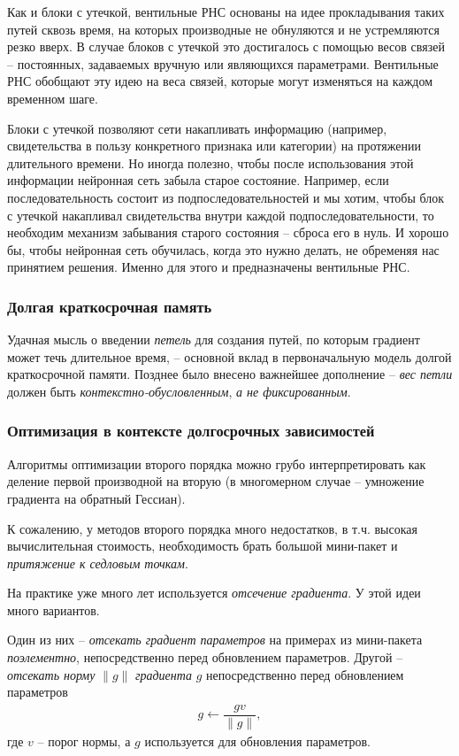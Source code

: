 \documentclass[%
	11pt,
	a4paper,
	utf8,
]{article}
\begin{document}
Как и блоки с утечкой, вентильные РНС основаны на идее прокладывания таких путей сквозь время, на которых производные  не обнуляются и не устремляются резко вверх. В случае блоков с утечкой это достигалось с помощью весов связей -- постоянных, задаваемых вручную или являющихся параметрами. Вентильные РНС обобщают эту идею на веса связей, которые могут изменяться на каждом временном шаге.

Блоки с утечкой позволяют сети накапливать информацию (например, свидетельства в пользу конкретного признака или категории) на протяжении длительного времени. Но иногда полезно, чтобы после использования этой информации нейронная сеть забыла старое состояние. Например, если последовательность состоит из подпоследовательностей и мы хотим, чтобы блок с утечкой накапливал свидетельства внутри каждой подпоследовательности, то необходим механизм забывания старого состояния -- сброса его в нуль. И хорошо бы, чтобы нейронная сеть обучилась, когда это нужно делать, не обременяя нас принятием решения. Именно для этого и предназначены вентильные РНС.

\subsubsection{Долгая краткосрочная память}

Удачная мысль о введении \emph{петель} для создания путей, по которым градиент может течь длительное время, -- основной вклад в первоначальную модель долгой краткосрочной памяти. Позднее было внесено важнейшее дополнение -- \emph{вес петли} должен быть \emph{контекстно-обусловленным}, \emph{а не фиксированным}.

\subsubsection{Оптимизация в контексте долгосрочных зависимостей}

Алгоритмы оптимизации второго порядка можно грубо интерпретировать как деление первой производной на вторую (в многомерном случае -- умножение градиента на обратный Гессиан).

{\color{red}К сожалению, у методов второго порядка много недостатков, в т.ч. высокая вычислительная стоимость, необходимость брать большой мини-пакет и \emph{притяжение к седловым точкам}.}

На практике уже много лет используется \emph{отсечение градиента}. У этой идеи много вариантов.

Один из них -- \emph{отсекать градиент параметров} на примерах из мини-пакета \emph{поэлементно}, непосредственно перед обновлением параметров. Другой -- \emph{отсекать норму} $ \| g \| $ \emph{градиента} $ g $ непосредственно перед обновлением параметров
\begin{align*}
	g \leftarrow \dfrac{g v}{ \| g \| },
\end{align*}
где $ v $ -- порог нормы, а $ g $ используется для обновления параметров.
\end{document}
